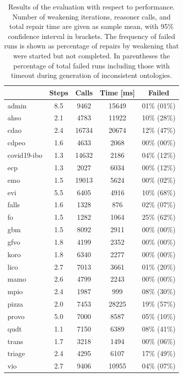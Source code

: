 \begin{table}[ht]
  \scriptsize
  \centering
  \begin{tabular}{|l|cccc|}
    \hline
    & Steps & Calls & Time [ms] & Failed \\
    \hline
    admin & 8.5 & 9462 & 15649 & 01\% (01\%) \\
    ahso & 2.1 & 4783 & 11922 & 10\% (28\%) \\
    cdao & 2.4 & 16734 & 20674 & 12\% (47\%) \\
    cdpeo & 1.6 & 4633 & 2068 & 00\% (00\%) \\
    covid19-ibo & 1.3 & 14632 & 2186 & 04\% (12\%) \\
    ecp & 1.3 & 2027 & 6034 & 00\% (12\%) \\
    emo & 1.5 & 19013 & 5624 & 00\% (02\%) \\
    evi & 5.5 & 6405 & 4916 & 10\% (68\%) \\
    falls & 1.6 & 1328 & 876 & 02\% (07\%) \\
    fo & 1.5 & 1282 & 1064 & 25\% (62\%) \\
    gbm & 1.5 & 8092 & 2911 & 00\% (00\%) \\
    gfvo & 1.8 & 4199 & 2352 & 00\% (00\%) \\
    koro & 1.8 & 6340 & 2277 & 00\% (00\%) \\
    lico & 2.7 & 7013 & 3661 & 01\% (20\%) \\
    mamo & 2.6 & 4799 & 2243 & 00\% (00\%) \\
    mpio & 2.4 & 1987 & 999 & 08\% (30\%) \\
    pizza & 2.0 & 7453 & 28225 & 19\% (57\%) \\
    provo & 5.0 & 7000 & 8587 & 05\% (10\%) \\
    qudt & 1.1 & 7150 & 6389 & 08\% (41\%) \\
    trans & 1.7 & 3218 & 1494 & 00\% (06\%) \\
    triage & 2.4 & 4295 & 6107 & 17\% (49\%) \\
    vio & 2.7 & 9406 & 10955 & 04\% (07\%) \\
    \hline
  \end{tabular}
  \caption{Results of the evaluation with respect to performance. Number of weakening iterations, reasoner calls, and total repair time are given as sample mean, with 95\% confidence interval in brackets. The frequency of failed runs is shown as percentage of repairs by weakening that were started but not completed. In parentheses the percentage of total failed runs including those with timeout during generation of inconsistent ontologies.}
  \label{table:results-perf}
\end{table}

